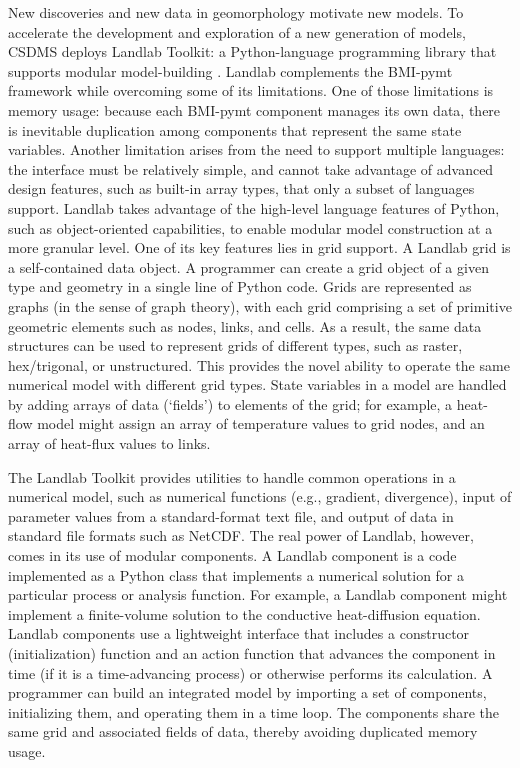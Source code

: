 \documentclass[10pt,twocolumn,preprint]{elsarticle}
\begin{document}
New discoveries and new data in geomorphology motivate new models. To accelerate the development and exploration of a new generation of models, CSDMS deploys Landlab Toolkit: a Python-language programming library that supports modular model-building \citep{hobley2017creative,barnhart2020short}. Landlab complements the BMI-pymt framework while overcoming some of its limitations. One of those limitations is memory usage: because each BMI-pymt component manages its own data, there is inevitable duplication among components that represent the same state variables. Another limitation arises from the need to support multiple languages: the interface must be relatively simple, and cannot take advantage of advanced design features, such as built-in array types, that only a subset of languages support. Landlab takes advantage of the high-level language features of Python, such as object-oriented capabilities, to enable modular model construction at a more granular level. One of its key features lies in grid support. A Landlab grid is a self-contained data object. A programmer can create a grid object of a given type and geometry in a single line of Python code. Grids are represented as graphs (in the sense of graph theory), with each grid comprising a set of primitive geometric elements such as nodes, links, and cells. As a result, the same data structures can be used to represent grids of different types, such as raster, hex/trigonal, or unstructured. This provides the novel ability to operate the same numerical model with different grid types. State variables in a model are handled by adding arrays of data (`fields') to elements of the grid; for example, a heat-flow model might assign an array of temperature values to grid nodes, and an array of heat-flux values to links. 

The Landlab Toolkit provides utilities to handle common operations in a numerical model, such as numerical functions (e.g., gradient, divergence), input of parameter values from a standard-format text file, and output of data in standard file formats such as NetCDF. The real power of Landlab, however, comes in its use of modular components. A Landlab component is a code implemented as a Python class that implements a numerical solution for a particular process or analysis function. For example, a Landlab component might implement a finite-volume solution to the conductive heat-diffusion equation. Landlab components use a lightweight interface that includes a constructor (initialization) function and an action function that advances the component in time (if it is a time-advancing process) or otherwise performs its calculation. A programmer can build an integrated model by importing a set of components, initializing them, and operating them in a time loop. The components share the same grid and associated fields of data, thereby avoiding duplicated memory usage.
\end{document}
